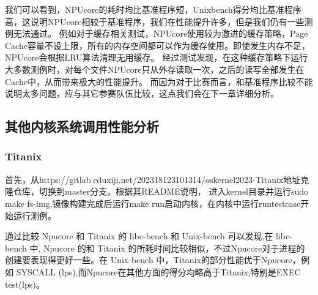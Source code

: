 我们可以看到，NPUcore的耗时均比基准程序短，Unixbench得分均比基准程序高，这说明NPUcore相较于基准程序，我们在性能提升许多，但是我们仍有一些测例无法通过。
例如对于缓存相关测试，NPUcore使用较为激进的缓存策略，Page Cache容量不设上限，所有的内存空间都可以作为缓存使用。即使发生内存不足，NPUcore会根据LRU算法清理无用缓存。
经过测试发现，在这种缓存策略下运行大多数测例时，对每个文件NPUcore只从外存读取一次，之后的读写全部发生在Cache中，从而带来极大的性能提升。
而因为对于比赛而言，和基准程序比较不能说明太多问题，应与其它参赛队伍比较，这点我们会在下一章详细分析。

\subsection{其他内核系统调用性能分析}


\subsubsection{Titanix}

首先，从https://gitlab.eduxiji.net/202318123101314/oskernel2023-Titanix地址克隆仓库，切换到master分支。根据其README说明，
进入kernel目录并运行sudo make fs-img,镜像构建完成后运行make run启动内核，在内核中运行runtestcase开始运行测例。



通过比较 Npucore 和 Titanix 的 libc-bench 和 Unix-bench 可以发现,在 libc-bench 中,
Npucore 的和 Titanix 的所耗时间比较相似，不过Npucore对于进程的创建要表现得更好一些。在 Unix-bench 中，Titanix的部分性能优于Npucore，例如
SYSCALL (lps),而Npucore在其他方面的得分均略高于Titanix,特别是EXEC test(lps)。

